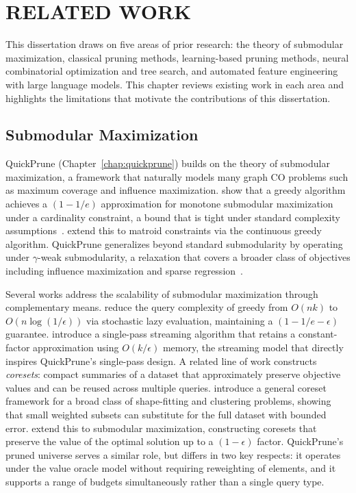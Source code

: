 \pagestyle{plain} %

\chapter{\uppercase {Related Work}} \label{chap:relatedwork}

This dissertation draws on five areas of prior research: the theory of submodular
maximization, classical pruning methods, learning-based pruning methods, neural
combinatorial optimization and tree search, and automated feature engineering with large
language models. This chapter reviews existing work in each area and highlights the
limitations that motivate the contributions of this dissertation.

\section{Submodular Maximization}

QuickPrune (Chapter~\ref{chap:quickprune}) builds on the theory of submodular
maximization, a framework that naturally models many graph CO problems such as maximum
coverage and influence maximization. \citet{nemhauser1978analysis} show that a greedy
algorithm achieves a $(1-1/e)$ approximation for monotone submodular maximization under a
cardinality constraint, a bound that is tight under standard complexity
assumptions~\citep{feige1998threshold}. \citet{vondrak2008optimal} extend this to
matroid constraints via the continuous greedy algorithm. QuickPrune generalizes beyond
standard submodularity by operating under $\gamma$-weak submodularity, a relaxation that
covers a broader class of objectives including influence maximization and sparse
regression~\citep{elenberg2018restricted}.

Several works address the scalability of submodular maximization through complementary
means. \citet{mirzasoleiman2015lazier} reduce the query complexity of greedy from
$O(nk)$ to $O(n\log(1/\epsilon))$ via stochastic lazy evaluation,
maintaining a $(1-1/e-\epsilon)$ guarantee. \citet{badanidiyuru2014streaming} introduce a single-pass
streaming algorithm that retains a constant-factor approximation using $O(k/\epsilon)$
memory, the streaming model that directly inspires QuickPrune's single-pass design. A
related line of work constructs \textit{coresets}: compact summaries of a dataset that
approximately preserve objective values and can be reused across multiple queries.
\citet{feldman2011unified} introduce a general coreset framework for a broad class of
shape-fitting and clustering problems, showing that small weighted subsets can substitute
for the full dataset with bounded error. \citet{mirzasoleiman2020coresets} extend this to
submodular maximization, constructing coresets that preserve the value of the optimal
solution up to a $(1-\epsilon)$ factor. QuickPrune's pruned universe serves a similar
role, but differs in two key respects: it operates under the value oracle model without
requiring reweighting of elements, and it supports a range of budgets simultaneously
rather than a single query type.


